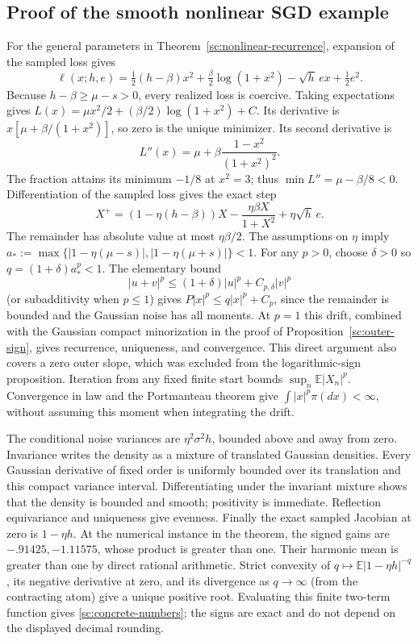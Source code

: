 \subsection{Proof of the smooth nonlinear SGD example}
For the general parameters in Theorem~\ref{sc:nonlinear-recurrence},
expansion of the sampled loss gives
\[
 \ell(x;h,e)=\tfrac12(h-\beta)x^2+\tfrac\beta2\log(1+x^2)
              -\sqrt h\,e x+\tfrac12e^2.
\]
Because \(h-\beta\ge\mu-s>0\), every realized loss is coercive.
Taking expectations gives
\(L(x)=\mu x^2/2+(\beta/2)\log(1+x^2)+C\).
Its derivative is \(x[\mu+\beta/(1+x^2)]\), so zero is the unique
minimizer. Its second derivative is
\[
 L''(x)=\mu+\beta\frac{1-x^2}{(1+x^2)^2}.
\]
The fraction attains its minimum \(-1/8\) at \(x^2=3\); thus
\(\min L''=\mu-\beta/8<0\).
Differentiation of the sampled loss gives the exact step
\[
 X^+=(1-\eta(h-\beta))X-\frac{\eta\beta X}{1+X^2}
            +\eta\sqrt h\,e.
\]
The remainder has absolute value at most \(\eta\beta/2\). The assumptions
on \(\eta\) imply
\(a_*:=\max\{|1-\eta(\mu-s)|,|1-\eta(\mu+s)|\}<1\).
For any \(p>0\), choose \(\delta>0\) so
\(q=(1+\delta)a_*^p<1\). The elementary bound
\[
 |u+v|^p\le(1+\delta)|u|^p+C_{p,\delta}|v|^p
\]
(or subadditivity when \(p\le1\)) gives
\(P|x|^p\le q|x|^p+C_p\), since the remainder is bounded and the
Gaussian noise has all moments. At \(p=1\) this drift, combined with the
Gaussian compact minorization in the proof of
Proposition~\ref{sc:outer-sign}, gives recurrence, uniqueness, and
convergence. This direct argument also covers a zero outer slope, which
was excluded from the logarithmic-sign proposition.
Iteration from any fixed finite start
bounds \(\sup_n\mathbb E|X_n|^p\). Convergence in law and the
Portmanteau theorem give \(\int|x|^p\pi(dx)<\infty\), without assuming
this moment when integrating the drift.

The conditional noise variances are \(\eta^2\sigma^2h\), bounded above
and away from zero. Invariance writes the density as a mixture of
translated Gaussian densities. Every Gaussian derivative of fixed
order is uniformly bounded over its translation and this compact
variance interval. Differentiating under the invariant mixture shows
that the density is bounded and smooth; positivity is immediate.
Reflection equivariance and uniqueness give evenness.
Finally the exact sampled Jacobian at zero is \(1-\eta h\).
At the numerical instance in the theorem, the signed gains are
\(-.91425,-1.11575\), whose product is greater than one.
Their harmonic mean is greater than one by direct rational arithmetic.
Strict convexity of \(q\mapsto\mathbb E|1-\eta h|^{-q}\), its negative
derivative at zero, and its divergence as \(q\to\infty\) (from the
contracting atom) give a unique positive root. Evaluating this finite
two-term function gives \eqref{sc:concrete-numbers}; the signs are exact
and do not depend on the displayed decimal rounding.

